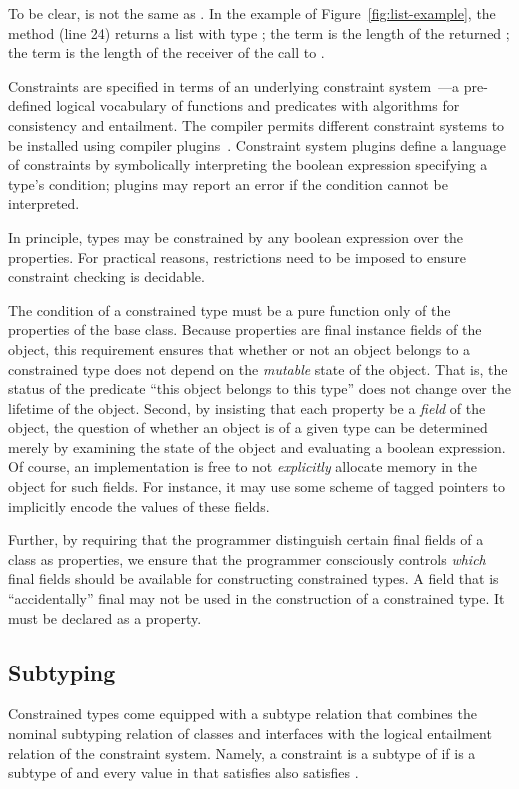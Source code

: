 To be clear,  is not the same as .  In the
 example of Figure~\ref{fig:list-example}, the
 method (line 24) returns
a list with type
; the term
 is the length of
the returned ; the term  is the length of the 
receiver of the call to .

Constraints are specified in terms of an underlying
constraint system~\cite{cccc}---a pre-defined logical vocabulary of
functions and predicates with algorithms for consistency and
entailment.  The \Xten{} compiler permits different constraint
systems to be installed using compiler
plugins~\cite{bracha04-pluggable}.
%
Constraint system plugins define a language of constraints by
symbolically interpreting
the boolean expression specifying a type's condition; plugins
may report an error if the condition cannot be interpreted.

In principle, types may be constrained by any boolean
expression over the properties.  For practical reasons,
restrictions need to be imposed to ensure constraint checking is
decidable.

The condition of a constrained type must be a pure
function only of the properties of the base class.
Because properties are
final instance fields of the object,
this requirement
ensures that whether or not an object belongs to a constrained type does
not depend on the {\em mutable} state of the object.
That is, the status of the
predicate ``this object belongs to this type'' does not
change over the lifetime of the object.  Second, by insisting that each
property be a {\em field} of the object, the question of
whether an object is of a given type can be
determined merely by examining the state of the object and evaluating
a boolean expression. Of course, an implementation is free to not {\em
explicitly} allocate memory in the object for such fields. For
instance, it may use some scheme of tagged pointers to implicitly
encode the values of these fields.

Further, by requiring that the programmer distinguish certain
final fields of a class as properties, we ensure that the programmer
consciously controls {\em which} final fields should be available for
constructing constrained types. A field that is ``accidentally''
final may not be used in the construction of a constrained type. It must be
declared as a property.


\subsection{Subtyping}
Constrained types come equipped with a subtype relation that
combines the nominal subtyping relation of classes and interfaces with
the logical entailment relation of the constraint system. Namely, a
constraint  is a subtype of  if  is a
subtype of  and every value in  that satisfies 
also satisfies .

